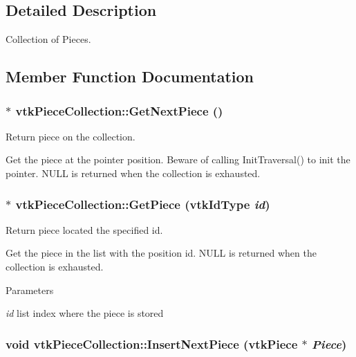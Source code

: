 \subsection{Detailed Description}
Collection of Pieces. 

\subsection{Member Function Documentation}
\hypertarget{classvtkPieceCollection_ae40adc69656f67b99b9e1fe07f94ad04}{
\subsubsection[{GetNextPiece}]{ $\ast$ vtkPieceCollection::GetNextPiece ()}}
\label{classvtkPieceCollection_ae40adc69656f67b99b9e1fe07f94ad04}


Return piece on the collection. 

Get the piece at the pointer position. Beware of calling InitTraversal() to init the pointer. NULL is returned when the collection is exhausted. \hypertarget{classvtkPieceCollection_a4e0569b11db93fd143cd2200529f41b7}{
\subsubsection[{GetPiece}]{ $\ast$ vtkPieceCollection::GetPiece (vtkIdType {\em id})}}
\label{classvtkPieceCollection_a4e0569b11db93fd143cd2200529f41b7}


Return piece located the specified id. 

Get the piece in the list with the position id. NULL is returned when the collection is exhausted. 
\begin{DoxyParams}{Parameters}
\item[{\em id}]list index where the piece is stored \end{DoxyParams}
\hypertarget{classvtkPieceCollection_a6f37b0535d1a952beaa969000f857f24}{
\subsubsection[{InsertNextPiece}]{\setlength{\rightskip}{0pt plus 5cm}void vtkPieceCollection::InsertNextPiece ({\bf vtkPiece} $\ast$ {\em Piece})}}
\label{classvtkPieceCollection_a6f37b0535d1a952beaa969000f857f24}


